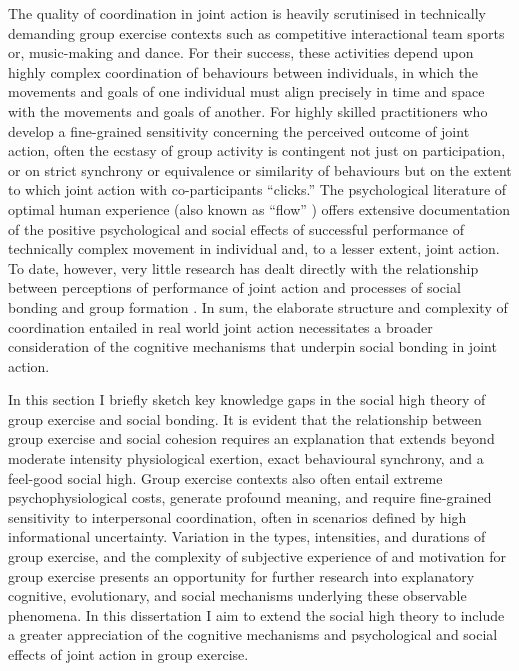 \begin{CJK}{UTF8}{gbsn}
The quality of coordination in joint action is heavily scrutinised in technically demanding group exercise contexts such as competitive interactional team sports or, music-making and dance.  For their success, these activities depend upon highly complex coordination of behaviours between individuals, in which the movements and goals of one individual must align precisely in time and space with the movements and goals of another.  For highly skilled practitioners who develop a fine-grained sensitivity concerning the perceived outcome of joint action, often the ecstasy of group activity is contingent not just on participation, or on strict synchrony or equivalence or similarity of behaviours but on the extent to which joint action with co-participants ``clicks.''  The psychological literature of optimal human experience (also known as ``flow'' \citep{Csikszentmihalyi1992}) offers extensive documentation of the positive psychological and social effects of successful performance of technically complex movement in individual and, to a lesser extent, joint action.  To date, however, very little research has dealt directly with the relationship between perceptions of performance of joint action and processes of social bonding and group formation \citep[but see][]{Marsh2009}.  In sum, the elaborate structure and complexity of coordination entailed in real world joint action necessitates a broader consideration of the cognitive mechanisms that underpin social bonding in joint action.

In this section I briefly sketch key knowledge gaps in the social high theory of group exercise and social bonding. It is evident that the relationship between group exercise and social cohesion requires an explanation that extends beyond moderate intensity physiological exertion, exact behavioural synchrony, and a feel-good social high.  Group exercise contexts also often entail extreme psychophysiological costs, generate profound meaning, and require fine-grained sensitivity to interpersonal coordination, often in scenarios defined by high informational uncertainty.  Variation in the types, intensities, and durations of group exercise, and the complexity of subjective experience of and motivation for group exercise presents an opportunity for further research into explanatory cognitive, evolutionary, and social mechanisms underlying these observable phenomena.   In this dissertation I aim to extend the social high theory to include a greater appreciation of the cognitive mechanisms and psychological and social effects of joint action in group exercise.


\end{CJK}
